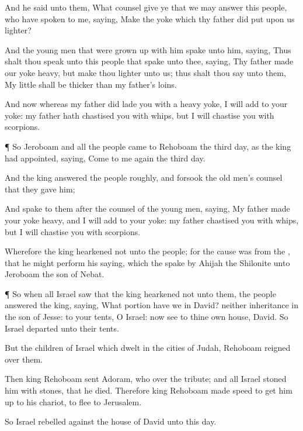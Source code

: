 {And he
said unto them, What counsel
give ye that we
may
answer this
people, who have
spoken to me,
saying,
Make the
yoke which thy
father did
put upon us
lighter?

And the young
men that were grown
up with him
spake unto him,
saying, Thus shalt thou
speak unto this
people that
spake unto thee,
saying, Thy
father
made our
yoke
heavy, but make thou
{}
lighter unto us; thus shalt thou
say unto them, My
little
{} shall be
thicker than my
father’s
loins.

And now whereas my
father did
lade you with a
heavy
yoke, I will
add to your
yoke: my
father hath
chastised you with
whips, but I will
chastise you with
scorpions.


\par }{\PP {}¶ So
Jeroboam and all the
people
came to
Rehoboam the
third
day, as the
king had
appointed,
saying, Come to me
again the
third
day.

And the
king
answered the
people
roughly, and
forsook the old
men’s
counsel that they
gave him;

And
spake to them after the
counsel of the young
men,
saying, My
father
made your
yoke
heavy, and I will
add to your
yoke: my
father
{}
chastised you with
whips, but I will
chastise you with
scorpions.

Wherefore the
king
hearkened not unto the
people; for the
cause was from the
{}, that he might
perform his
saying, which the
{}
spake
by
Ahijah the
Shilonite unto
Jeroboam the
son of
Nebat.


\par }{\PP {}¶
So when all
Israel
saw that the
king
hearkened not unto them, the
people
answered the
king,
saying, What
portion have we in
David? neither
{}
inheritance in the
son of
Jesse: to your
tents, O
Israel: now
see to thine own
house,
David. So
Israel
departed unto their
tents.

But
{} the
children of
Israel which
dwelt in the
cities of
Judah,
Rehoboam
reigned over them.

Then
king
Rehoboam
sent
Adoram, who
{} over the
tribute; and all
Israel
stoned him with
stones, that he
died. Therefore
king
Rehoboam made
speed to get him
up to his
chariot, to
flee to
Jerusalem.

So
Israel
rebelled against the
house of
David unto this
day.

}
